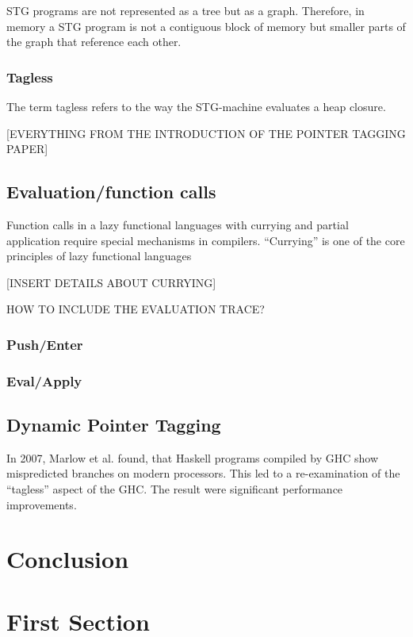 \documentclass[runningheads]{llncs}
\begin{document}
STG programs are not represented as a tree but as a graph. Therefore, in memory a STG program is not a contiguous block of memory but smaller parts of the graph that reference each other.

\subsubsection{Tagless}
The term tagless refers to the way the STG-machine evaluates a heap closure. 


[EVERYTHING FROM THE INTRODUCTION OF THE POINTER TAGGING PAPER]


\subsection{Evaluation/function calls}
Function calls in a lazy functional languages with currying and partial application require special mechanisms in compilers.
\enquote{Currying} is one of the core principles of lazy functional languages 

[INSERT DETAILS ABOUT CURRYING]


HOW TO INCLUDE THE EVALUATION TRACE?



\subsubsection{Push/Enter}
\subsubsection{Eval/Apply}

\subsection{Dynamic Pointer Tagging}
In 2007, Marlow et al.\cite{marlow2007faster} found, that Haskell programs compiled by GHC show mispredicted branches on modern processors. This led to a re-examination of the \enquote{tagless} aspect of the GHC. The result were significant performance improvements.


\section{Conclusion}



\section{First Section}
\end{document}
